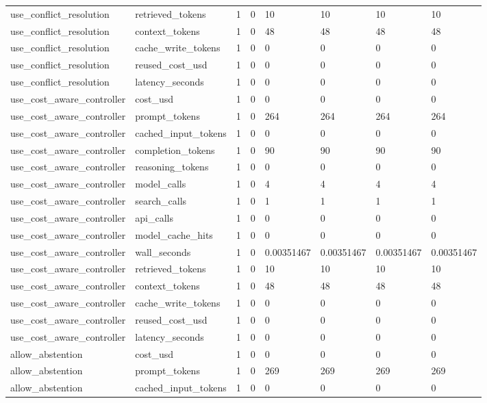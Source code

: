 \begin{tabular}{llllllll}
use\_conflict\_resolution & retrieved\_tokens & 1 & 0 & 10 & 10 & 10 & 10 \\
use\_conflict\_resolution & context\_tokens & 1 & 0 & 48 & 48 & 48 & 48 \\
use\_conflict\_resolution & cache\_write\_tokens & 1 & 0 & 0 & 0 & 0 & 0 \\
use\_conflict\_resolution & reused\_cost\_usd & 1 & 0 & 0 & 0 & 0 & 0 \\
use\_conflict\_resolution & latency\_seconds & 1 & 0 & 0 & 0 & 0 & 0 \\
use\_cost\_aware\_controller & cost\_usd & 1 & 0 & 0 & 0 & 0 & 0 \\
use\_cost\_aware\_controller & prompt\_tokens & 1 & 0 & 264 & 264 & 264 & 264 \\
use\_cost\_aware\_controller & cached\_input\_tokens & 1 & 0 & 0 & 0 & 0 & 0 \\
use\_cost\_aware\_controller & completion\_tokens & 1 & 0 & 90 & 90 & 90 & 90 \\
use\_cost\_aware\_controller & reasoning\_tokens & 1 & 0 & 0 & 0 & 0 & 0 \\
use\_cost\_aware\_controller & model\_calls & 1 & 0 & 4 & 4 & 4 & 4 \\
use\_cost\_aware\_controller & search\_calls & 1 & 0 & 1 & 1 & 1 & 1 \\
use\_cost\_aware\_controller & api\_calls & 1 & 0 & 0 & 0 & 0 & 0 \\
use\_cost\_aware\_controller & model\_cache\_hits & 1 & 0 & 0 & 0 & 0 & 0 \\
use\_cost\_aware\_controller & wall\_seconds & 1 & 0 & 0.00351467 & 0.00351467 & 0.00351467 & 0.00351467 \\
use\_cost\_aware\_controller & retrieved\_tokens & 1 & 0 & 10 & 10 & 10 & 10 \\
use\_cost\_aware\_controller & context\_tokens & 1 & 0 & 48 & 48 & 48 & 48 \\
use\_cost\_aware\_controller & cache\_write\_tokens & 1 & 0 & 0 & 0 & 0 & 0 \\
use\_cost\_aware\_controller & reused\_cost\_usd & 1 & 0 & 0 & 0 & 0 & 0 \\
use\_cost\_aware\_controller & latency\_seconds & 1 & 0 & 0 & 0 & 0 & 0 \\
allow\_abstention & cost\_usd & 1 & 0 & 0 & 0 & 0 & 0 \\
allow\_abstention & prompt\_tokens & 1 & 0 & 269 & 269 & 269 & 269 \\
allow\_abstention & cached\_input\_tokens & 1 & 0 & 0 & 0 & 0 & 0 \\

\end{tabular}
